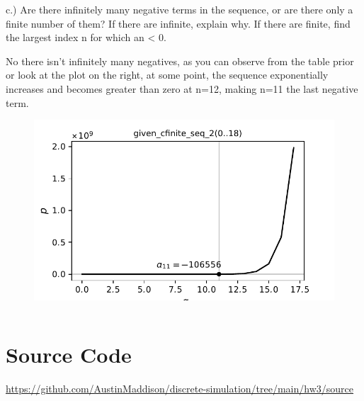 \documentclass{article}
\begin{document}
\begin{multicols}{2}
\noindent
c.)  Are there infinitely many negative terms in the sequence, or are there only a finite number of them? If there are infinite, explain why. If there are finite, find the largest index n for which an < 0.

No there isn't infinitely many negatives, as you can observe from the table prior or look at the plot on the right, at some point, the sequence exponentially increases and becomes greater than zero at n=12, making n=11 the last negative term.

\begin{figure}[H]
	\centering
	\includegraphics[width=1\linewidth]{../drawings/p5.pdf}
\end{figure}

\end{multicols}





\begin{lstlisting}

\end{lstlisting}








	





\section*{Source Code}
\href{https://github.com/AustinMaddison/discrete-simulation/tree/main/hw3/source}{https://github.com/AustinMaddison/discrete-simulation/tree/main/hw3/source}

%
%
\end{document}
